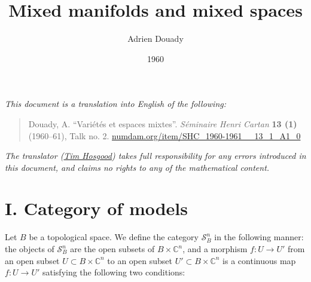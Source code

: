 \documentclass[british]{article}
\title{Mixed manifolds and mixed spaces}
\author{Adrien Douady}
\date{1960}
\newcommand{\oldpage}[1]{\marginpar{\footnotesize$\Big\vert$ \textit{p.~#1}}}
\begin{document}
\maketitle
\thispagestyle{fancy}

\setcounter{footnote}{0}



\emph{This document is a translation into English of the following:}

\begin{quote}
Douady, A. ``Variétés et espaces mixtes''. \emph{Séminaire Henri Cartan}
\textbf{13 (1)} (1960--61), Talk no. 2.
\href{https://www.numdam.org/item/SHC_1960-1961__13_1_A1_0}{numdam.org/item/SHC\_1960-1961\_\_13\_1\_A1\_0}
\end{quote}

\emph{The translator (\href{https://thosgood.net}{Tim Hosgood}) takes
full responsibility for any errors introduced in this document, and
claims no rights to any of the mathematical content.}

\tableofcontents

\providecommand{\scr}[1]{{\mathscr{#1}}}
\renewcommand{\cal}[1]{{\mathcal{#1}}}
\renewcommand{\frak}[1]{{\mathfrak{#1}}}
\renewcommand{\geq}{\geqslant}
\renewcommand{\leq}{\leqslant}

\providecommand{\ZZ}{\mathbb{Z}}
\providecommand{\RR}{\mathbb{R}}
\providecommand{\CC}{\mathbb{C}}
\providecommand{\DD}{\mathrm{D}}
\providecommand{\HH}{\mathrm{H}}
\providecommand{\PP}{\mathbb{P}}
\providecommand{\dd}{\mathrm{d}}

\providecommand{\Hom}{\operatorname{Hom}}
\providecommand{\GL}{\operatorname{GL}}
\providecommand{\SL}{\operatorname{SL}}
\providecommand{\Ker}{\operatorname{Ker}}

\section*{I. Category of models}\label{two-section-I}

\oldpage{2-01}

Let \(B\) be a topological space. We define the category
\(\mathscr{S}_B^n\) in the following manner: the objects of
\(\mathscr{S}_B^n\) are the open subsets of \(B\times\mathbb{C}^n\), and
a morphism \(f\colon U\to U'\) from an open subset
\(U\subset B\times\mathbb{C}^n\) to an open subset
\(U'\subset B\times\mathbb{C}^n\) is a continuous map
\(f\colon U\to U'\) satisfying the following two conditions:
\end{document}
